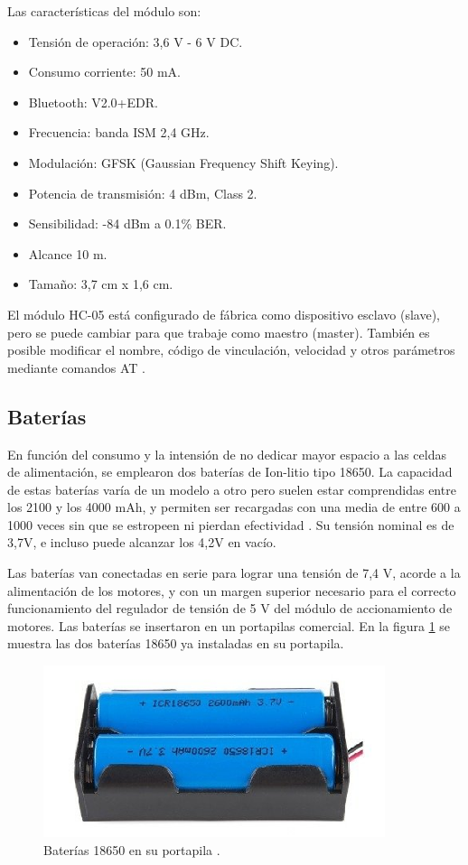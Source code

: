 Las características del módulo son:
\begin{itemize}
	\item Tensión de operación: 3,6 V - 6 V DC.
	\item Consumo corriente: 50 mA.
	\item Bluetooth: V2.0+EDR.
	\item Frecuencia: banda ISM 2,4 GHz.
	\item Modulación: GFSK (Gaussian Frequency Shift Keying).
	\item Potencia de transmisión: 4 dBm, Class 2.
	\item Sensibilidad: -84 dBm a 0.1\% BER.
	\item Alcance 10 m.
	\item Tamaño: 3,7 cm x 1,6 cm.
\end{itemize}

El módulo HC-05 está configurado de fábrica como dispositivo esclavo (slave), pero se puede cambiar para que trabaje como maestro (master). También es posible modificar el nombre, código de vinculación, velocidad y otros parámetros mediante comandos AT \citep{HC05}. 



\subsection{Baterías}

En función del consumo y la intensión de no dedicar mayor espacio a las celdas de alimentación, se emplearon dos baterías de Ion-litio tipo 18650. La capacidad de estas baterías varía de un modelo a otro pero suelen estar comprendidas entre los 2100 y los 4000 mAh, y  permiten ser recargadas con una media de entre 600 a 1000 veces sin que se estropeen ni pierdan efectividad \citep{18650}. Su tensión nominal es de 3,7V, e incluso puede alcanzar los 4,2V en vacío.

Las baterías van conectadas en serie para lograr una tensión de 7,4 V, acorde a la alimentación de los motores, y con un margen superior necesario para el correcto funcionamiento del regulador de tensión de 5 V del módulo de accionamiento de motores. 
Las baterías se insertaron en un portapilas comercial. En la figura \ref{fig:portapila} se muestra las dos baterías 18650 ya instaladas en su portapila.


\begin{figure}[h]
	\centering
	\includegraphics[width=10cm]{./Figures/portapilas.PNG}
	\caption{Baterías 18650 en su portapila .}
	\label{fig:portapila}
\end{figure}



